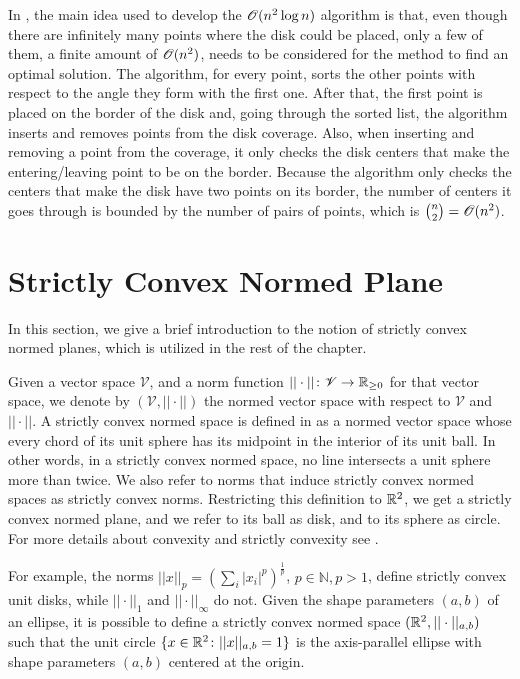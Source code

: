 In , the main idea used to develop the $\mathscr{O}(n^2\log{n})$ algorithm is that, even though there are infinitely many points where the disk could be placed, only a few of them, a finite amount of $\mathscr{O}(n^2)$, needs to be considered for the method to find an optimal solution.
The algorithm, for every point, sorts the other points with respect to the angle they form with the first one. After that, the first point is placed on the border of the disk and, going through the sorted list, the algorithm inserts and removes points from the disk coverage. Also, when inserting and removing a point from the coverage, it only checks the disk centers that make the entering/leaving point to be on the border. Because the algorithm only checks the centers that make the disk have two points on its border, the number of centers it goes through is bounded by the number of pairs of points, which is $\binom{n}{2} = \mathscr{O}(n^2)$.

\section{Strictly Convex Normed Plane}

In this section, we give a brief introduction to the notion of strictly convex normed planes, which is utilized in the rest of the chapter.

Given a vector space $\mathscr{V}$, and a norm function $||\cdot|| \colon \mathscr{V} \to \mathbb{R}_{\ge0}$ for that vector space, we denote by $(\mathscr{V}, ||\cdot||)$ the normed vector space with respect to $\mathscr{V}$ and $||\cdot||$.
A strictly convex normed space is defined in  as a normed vector space whose every chord of its unit sphere has its midpoint in the interior of its unit ball. In other words, in a strictly convex normed space, no line intersects a unit sphere more than twice. 
We also refer to norms that induce strictly convex normed spaces as strictly convex norms.
Restricting this definition to $\mathbb{R}^2$, we get a strictly convex normed plane, and we refer to its ball as disk, and to its sphere as circle.
For more details about convexity and strictly convexity see .

For example, the norms $||x||_p=(\sum_{i} |x_i|^p)^{\frac{1}{p}}$, $p\in \mathbb{N}, p>1$, define strictly convex unit disks, while $||\cdot||_1$ and $||\cdot||_{\infty}$ do not.
Given the shape parameters $(a, b)$ of an ellipse, it is possible to define a strictly convex normed space $(\mathbb{R}^2,||\cdot||_{a,b})$ such that the unit circle $\{x \in \mathbb{R}^2\colon ||x||_{a, b} = 1\}$ is the axis-parallel ellipse with shape parameters $(a, b)$ centered at the origin.


